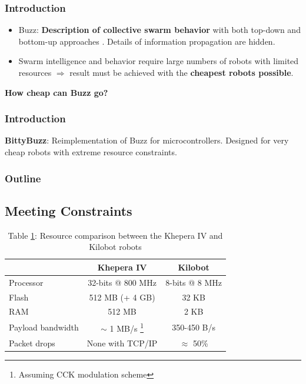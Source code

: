 \documentclass{beamer}
\begin{document}
	\begin{frame}
		\titlepage
	\end{frame}
	\begin{frame}
		\frametitle{Introduction}
		\begin{itemize}
			\item Buzz: \textbf{Description of collective swarm behavior} with both top-down and bottom-up approaches \cite{buzz_arxiv}. Details of information propagation are hidden.
			\item Swarm intelligence and behavior require large numbers of robots with limited resources $\Rightarrow$ result must be achieved with the \textbf{cheapest robots possible}.
		\end{itemize}

		\centering \Large
		\textbf{How cheap can Buzz go?}
	\end{frame}
	\begin{frame}
		\frametitle{Introduction}
		\textbf{BittyBuzz}: Reimplementation of Buzz for microcontrollers. Designed for very cheap robots with extreme resource constraints.
	\end{frame}
	\begin{frame}
		\frametitle{Outline}
		\tableofcontents
	\end{frame}
	\begin{frame}
		\section{Meeting Constraints}
		\begin{table}
			\begin{tabular}{l|c|c}
				& Khepera IV        & Kilobot\\
				\hline
				Processor         & 32-bits @ 800 MHz & 8-bits @ 8 MHz\\
				Flash             & 512 MB (+ 4 GB)   & 32 KB\\
				RAM               & 512 MB            & 2 KB\\
				Payload bandwidth & $\sim$ 1 MB/s \footnote{Assuming CCK modulation scheme} \cite{khepera_wifi}  & 350-450 B/s\\
				Packet drops      & None with TCP/IP  & $\approx$ 50\%
			\end{tabular}
			\caption{
				\label{table:khepera kilobot comparison}Table \ref{table:khepera kilobot comparison}: Resource comparison between the Khepera IV and Kilobot robots \cite{khepera_specs}}
		\end{table}
	\end{frame}
\end{document}
